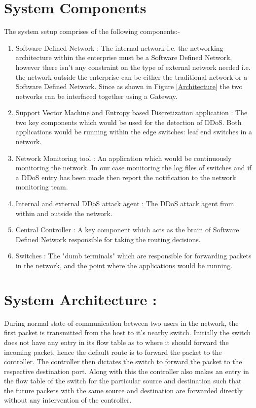 \documentclass[12pt,a4paper,final]{report}
\begin{document}
\section{System Components}
The system setup comprises of the following components:-
\begin{enumerate}
\item
Software Defined Network :
\newline
The internal network i.e. the networking architecture within the enterprise must be a Software Defined Network, however there isn't any constraint on the type of external network needed i.e. the network outside the enterprise can be either the traditional network or a Software Defined Network. Since as shown in Figure \ref{Architecture} the two networks can be interfaced together using a Gateway.

\item
Support Vector Machine and Entropy based Discretization application :
\newline
The two key components which would be used for the detection of DDoS. Both applications would be running within the edge switches:  leaf end switches in a network. 

\item
Network Monitoring tool :
\newline
An application which would be continuously monitoring the network. In our case monitoring the log files of switches and if a DDoS entry has been made then report the notification to the network monitoring team.

\item
Internal and external DDoS attack agent :
\newline
The DDoS attack agent from within and outside the network.

\item
Central Controller :
\newline
A key component which acts as the brain of Software Defined Network responsible for taking the routing decisions.

\item
Switches :
\newline
The "dumb terminals" which are responsible for forwarding packets in the network, and the point where the applications would be running.
\end{enumerate}

\section{System Architecture :}
During normal state of communication between two users in the network, the first packet is transmitted from the host to it's nearby switch. Initially the switch does not have any entry in its flow table as to where it should forward the incoming packet, hence the default route is to forward the packet to the controller. The controller then dictates the switch to forward the packet to the respective destination port. Along with this the controller also makes an entry in the flow table of the switch for the particular source and destination such that the future packets with the same source and destination are forwarded directly without any intervention of the controller.
\end{document}
